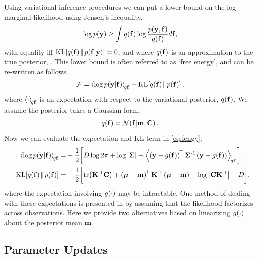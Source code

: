 \documentclass{article} %
\begin{document}
Using variational inference procedures we can put a lower bound on the
log-marginal likelihood using Jensen's inequality, 
\begin{equation}
    \log p\!\left({\mathbf{y}}\right) \geq \int q\!\left({\mathbf{f}}\right) \log 
        \frac{p\!\left({\mathbf{y}, \mathbf{f}}\right)}{q\!\left({\mathbf{f}}\right)} d\mathbf{f},
\end{equation}
with equality iff $\text{KL}\!\left[{{q\!\left({\mathbf{f}}\right)}\!\parallel\!{p\!\left({\mathbf{f}}\middle\vert{\ensuremath{\mathbf{y}}}\right)}}\right] = 0$, and where
$q\!\left({\mathbf{f}}\right)$ is an approximation to the true posterior,
\probC{\lstate}{\obs}. This lower bound is often referred to as `free energy',
and can be re-written as follows
\begin{equation}
    \mathcal{F} = \left\langle{\log \ensuremath{p\!\left({\mathbf{y}}\middle\vert{\ensuremath{\mathbf{f}}}\right)}}\right\rangle_{\!{q\mathbf{f}}}
        - \text{KL}\!\left[{{q\!\left({\mathbf{f}}\right)}\!\parallel\!{p\!\left({\mathbf{f}}\right)}}\right],
    \label{eq:fengy}
\end{equation}
where $\left\langle{\cdot}\right\rangle_{\!{q\mathbf{f}}}$ is an expectation with respect to the
variational posterior, $q\!\left({\mathbf{f}}\right)$. We assume the posterior takes a
Gaussian form,
\begin{equation}
    q\!\left({\mathbf{f}}\right) = \mathcal{N}\!\left({\mathbf{f}}\middle\vert{\ensuremath{\mathbf{m}}, \ensuremath{\mathbf{C}}}\right). \label{eq:varpost}
\end{equation}
Now we can evaluate the expectation and KL term in \eqref{eq:fengy},
\begin{align}
    \expec{q\lstate}{\log \probC{\obs}{\lstate}}
        =& - \frac{1}{2} \bigg[ 
            D\log{2\pi} + \log\deter{\lcov} 
            + \expec{q\lstate}{\brac{\obs - \nonlin{\lstate}}\transpose\lcov\inv
            \brac{\obs - \nonlin{\lstate}}}\bigg],
            \label{eq:qlike} \\
     - \KL{\qrob{\lstate}}{\prob{\lstate}}
        =& - \frac{1}{2} \bigg[\trace{\prcov\inv\pocov}
        + \brac{\prmean - \pomean}\transpose\prcov\inv
        \brac{\prmean - \pomean} 
        - \log \deter{\pocov\prcov\inv}
        - D\bigg] \label{eq:qkl}.
\end{align}
where the expectation involving $g\!\left({{\cdot}}\right)$ may be intractable. One method
of dealing with these expectations is presented in \cite{Opper2009} by assuming
that the likelihood factorizes across observations. Here we provide two
alternatives based on linearizing $g\!\left({{\cdot}}\right)$ about  the posterior mean
$\mathbf{m}$.


\subsection{Parameter Updates}
\end{document}
